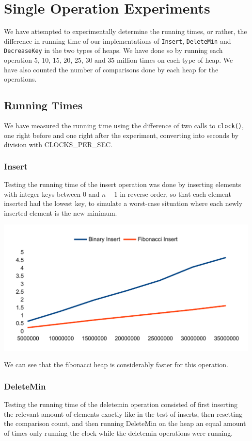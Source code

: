 \section{Single Operation Experiments}
We have attempted to experimentally determine the running times, or rather, the difference in running time of our implementations of \verb#Insert#, \verb#DeleteMin# and \verb#DecreaseKey# in the two types of heaps. We have done so by running each operation 5, 10, 15, 20, 25, 30 and 35 million times on each type of heap. We have also counted the number of comparisons done by each heap for the operations.

\subsection{Running Times}
We have measured the running time using the difference of two calls to \verb#clock()#, one right before and one right after the experiment, converting into seconds by division with CLOCKS\_PER\_SEC.

\subsubsection{Insert}
Testing the running time of the insert operation was done by inserting elements with integer keys between $0$ and $n-1$ in reverse order, so that each element inserted had the lowest key, to simulate a worst-case situation where each newly inserted element is the new minimum.

\includegraphics[width=\textwidth]{graphs/insert_graph.pdf}

We can see that the fibonacci heap is considerably faster for this operation.

\subsubsection{DeleteMin}
Testing the running time of the deletemin operation consisted of first inserting the relevant amount of elements exactly like in the test of inserts, then resetting the comparison count, and then running DeleteMin on the heap an equal amount of times only running the clock while the deletemin operations were running.

